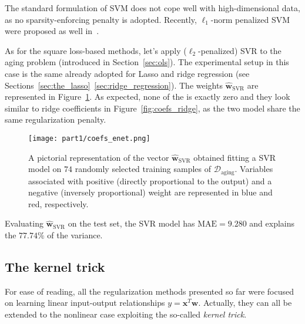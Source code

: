 			The standard formulation of SVM does not cope well with high-dimensional data, as no sparsity-enforcing penalty is adopted. Recently, $\ell_1$-norm penalized SVM were proposed as well in~\cite{zhu20041, peng2016error}.

			As for the square loss-based methods, let's apply ($\ell_2$-penalized) SVR to the aging problem (introduced in Section~\ref{sec:ols}).
			The experimental setup in this case is the same already adopted for Lasso and ridge regression (see Sections~\ref{sec:the_lasso}~\ref{sec:ridge_regression}).
			The weights $\bm{\hat w}_{\text{SVR}}$ are represented in Figure~\ref{fig:coefs_svr}. As expected, none of the is exactly zero and they look similar to ridge coefficients in Figure~\ref{fig:coefs_ridge}, as the two model share the same regularization penalty.
			\begin{figure}[!h]
				\centering
				\texttt{[image: part1/coefs\_enet.png]}
				\caption{A pictorial representation of the vector $\bm{\hat w}_{\text{SVR}}$ obtained fitting a SVR model on $74$ randomly selected training samples of $\mathcal{D}_{\text{aging}}$. Variables associated with positive (\ie directly proportional to the output) and a negative (\ie inversely proportional) weight are represented in blue and red, respectively.} \label{fig:coefs_svr}
			\end{figure}
			Evaluating $\bm{\hat w}_{\text{SVR}}$ on the test set, the SVR model has $\text{MAE}=9.280$ and explains the $77.74\%$ of the variance.


			\subsection{The kernel trick} \label{sec:kernel_trick}
			For ease of reading, all the regularization methods presented so far were focused on learning linear input-output relationships $y = \bm{x}^T\bm{w}$. Actually, they can all be extended to the nonlinear case exploiting the so-called \textit{kernel trick}.

